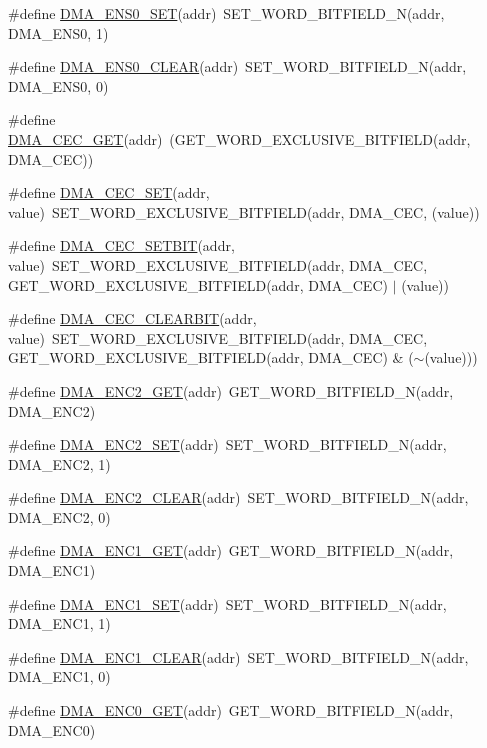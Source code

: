 \begin{DoxyCompactItemize}
\item 
\#define \hyperlink{a00548_af49c8e8663414abf6f5e9007a889fa5f}{DMA\_\-ENS0\_\-SET}(addr)~SET\_\-WORD\_\-BITFIELD\_\-N(addr, DMA\_\-ENS0, 1)
\item 
\#define \hyperlink{a00548_a70f55805dd2fc681ed2289e29d5f1b2d}{DMA\_\-ENS0\_\-CLEAR}(addr)~SET\_\-WORD\_\-BITFIELD\_\-N(addr, DMA\_\-ENS0, 0)
\item 
\#define \hyperlink{a00548_a269cbc0629e6042bf6f2528137a9b864}{DMA\_\-CEC\_\-GET}(addr)~(GET\_\-WORD\_\-EXCLUSIVE\_\-BITFIELD(addr, DMA\_\-CEC))
\item 
\#define \hyperlink{a00548_a548b2ba277c28c50cdc294d73915c23e}{DMA\_\-CEC\_\-SET}(addr, value)~SET\_\-WORD\_\-EXCLUSIVE\_\-BITFIELD(addr, DMA\_\-CEC, (value))
\item 
\#define \hyperlink{a00548_adcf9b500b8dc261816e1c05c0d14092e}{DMA\_\-CEC\_\-SETBIT}(addr, value)~SET\_\-WORD\_\-EXCLUSIVE\_\-BITFIELD(addr, DMA\_\-CEC, GET\_\-WORD\_\-EXCLUSIVE\_\-BITFIELD(addr, DMA\_\-CEC) $|$ (value))
\item 
\#define \hyperlink{a00548_ac1de8cc43903ea23c5ff08b46719b4c7}{DMA\_\-CEC\_\-CLEARBIT}(addr, value)~SET\_\-WORD\_\-EXCLUSIVE\_\-BITFIELD(addr, DMA\_\-CEC, GET\_\-WORD\_\-EXCLUSIVE\_\-BITFIELD(addr, DMA\_\-CEC) \& ($\sim$(value)))
\item 
\#define \hyperlink{a00548_a1d45150ecdbb5678c4f0f1b94cd9d211}{DMA\_\-ENC2\_\-GET}(addr)~GET\_\-WORD\_\-BITFIELD\_\-N(addr, DMA\_\-ENC2)
\item 
\#define \hyperlink{a00548_a5830682e0f6d0775e86038f300f526c0}{DMA\_\-ENC2\_\-SET}(addr)~SET\_\-WORD\_\-BITFIELD\_\-N(addr, DMA\_\-ENC2, 1)
\item 
\#define \hyperlink{a00548_a3d7bae7d8611a3ea67dda337eaea5912}{DMA\_\-ENC2\_\-CLEAR}(addr)~SET\_\-WORD\_\-BITFIELD\_\-N(addr, DMA\_\-ENC2, 0)
\item 
\#define \hyperlink{a00548_a19d3acb49f816f017a7eba379bd4ba93}{DMA\_\-ENC1\_\-GET}(addr)~GET\_\-WORD\_\-BITFIELD\_\-N(addr, DMA\_\-ENC1)
\item 
\#define \hyperlink{a00548_a6e9013321326fa464ab5cd3820ac66af}{DMA\_\-ENC1\_\-SET}(addr)~SET\_\-WORD\_\-BITFIELD\_\-N(addr, DMA\_\-ENC1, 1)
\item 
\#define \hyperlink{a00548_aef875b21847dd1aabf126824f66853b6}{DMA\_\-ENC1\_\-CLEAR}(addr)~SET\_\-WORD\_\-BITFIELD\_\-N(addr, DMA\_\-ENC1, 0)
\item 
\#define \hyperlink{a00548_af28c4945a846a696abf296dba71f7f6e}{DMA\_\-ENC0\_\-GET}(addr)~GET\_\-WORD\_\-BITFIELD\_\-N(addr, DMA\_\-ENC0)

\end{DoxyCompactItemize}
